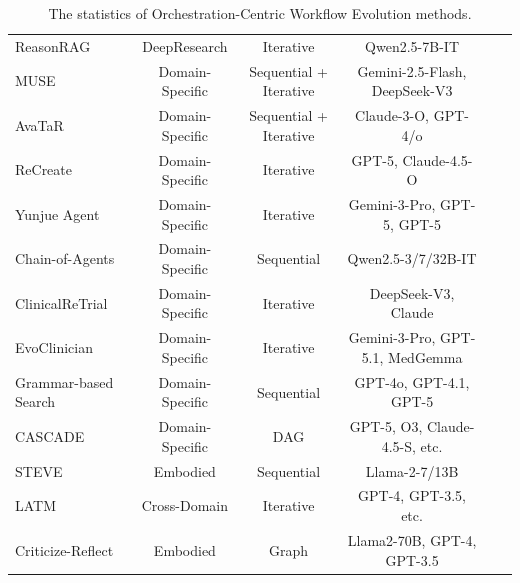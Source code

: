 \documentclass{llmxive}
\providecommand{\Yes}{\ding{51}}
\providecommand{\No}{\ding{55}}
\begin{document}
\begin{table}[htbp]
{\begin{tabular}{lccccc}
ReasonRAG \cite{ReasonRAG} & DeepResearch & Iterative & Qwen2.5-7B-IT & \Yes & \No \\
MUSE \cite{MUSE} & Domain-Specific & Sequential + Iterative & Gemini-2.5-Flash, DeepSeek-V3 & \No & \No \\
AvaTaR \cite{AVATAR} & Domain-Specific & Sequential + Iterative & Claude-3-O, GPT-4/o & \No & \No \\
ReCreate \cite{ReCreate} & Domain-Specific & Iterative & GPT-5, Claude-4.5-O & \Yes & \No \\
Yunjue Agent \cite{Yunjue_Agent} & Domain-Specific & Iterative & Gemini-3-Pro, GPT-5, GPT-5 & \No & \Yes \\
Chain-of-Agents \cite{Chain-of-Agents} & Domain-Specific & Sequential & Qwen2.5-3/7/32B-IT & \Yes & \Yes \\
ClinicalReTrial \cite{ClinicalReTrial} & Domain-Specific & Iterative & DeepSeek-V3, Claude & \No & \Yes \\
EvoClinician \cite{EvoClinician} & Domain-Specific & Iterative & Gemini-3-Pro, GPT-5.1, MedGemma & \No & \Yes \\
Grammar-based Search \cite{Grammar_based_Search} & Domain-Specific & Sequential & GPT-4o, GPT-4.1, GPT-5 & \No & \Yes \\
CASCADE \cite{CASCADE} & Domain-Specific & DAG & GPT-5, O3, Claude-4.5-S, etc. & \No & \Yes \\
STEVE \cite{STEVE} & Embodied & Sequential & Llama-2-7/13B & \Yes & \Yes \\
LATM \cite{LATM} & Cross-Domain & Iterative & GPT-4, GPT-3.5, etc. & \No & \Yes \\
Criticize-Reflect \cite{Criticize_Reflect} & Embodied & Graph & Llama2-70B, GPT-4, GPT-3.5 & \No & \Yes \\
\bottomrule
\end{tabular}
}
\caption{The statistics of Orchestration-Centric Workflow Evolution methods.}
\end{table}
\end{document}
